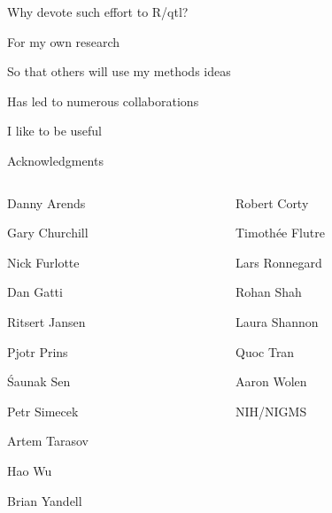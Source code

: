 \documentclass[12pt,t,aspectratio=169]{beamer}
\begin{document}
\begin{frame}{Why devote such effort to R/qtl?}

  \bbi
\item For my own research
\item So that others will use my methods ideas
\item Has led to numerous collaborations
\item I like to be useful
  \ei

\end{frame}







\begin{frame}[c]{Acknowledgments}

\begin{columns}[T]
  \begin{column}[T]{0.5\textwidth}
    \vspace{0pt}
\bi
\item[] Danny Arends
\item[] Gary Churchill
\item[] Nick Furlotte
\item[] Dan Gatti
\item[] Ritsert Jansen
\item[] Pjotr Prins
\item[] \'Saunak Sen
\item[] Petr Simecek
\item[] Artem Tarasov
\item[] Hao Wu
\item[] Brian Yandell
  \ei
  \end{column} \hfill
\begin{column}[T]{0.5\textwidth}
\vspace*{0mm}

  \bi
\item[] Robert Corty
\item[] Timoth\'ee Flutre
\item[] Lars Ronnegard
\item[] Rohan Shah
\item[] Laura Shannon
\item[] Quoc Tran
\item[] Aaron Wolen
\item[]
\item[] NIH/NIGMS
  \ei
\end{column}
\end{columns}

\end{frame}
\end{document}
